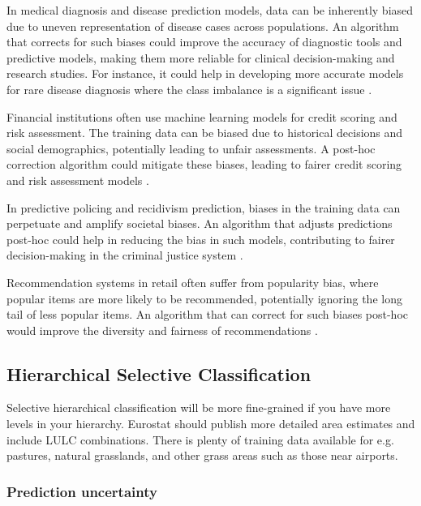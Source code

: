             In medical diagnosis and disease prediction models, data can be inherently biased due to uneven representation of disease cases across populations. An algorithm that corrects for such biases could improve the accuracy of diagnostic tools and predictive models, making them more reliable for clinical decision-making and research studies. For instance, it could help in developing more accurate models for rare disease diagnosis where the class imbalance is a significant issue \citep{weiss2004mining,krawczyk2016learning}.

            Financial institutions often use machine learning models for credit scoring and risk assessment. The training data can be biased due to historical decisions and social demographics, potentially leading to unfair assessments. A post-hoc correction algorithm could mitigate these biases, leading to fairer credit scoring and risk assessment models \citep{chen2018why, kamiran2012data}.

            In predictive policing and recidivism prediction, biases in the training data can perpetuate and amplify societal biases. An algorithm that adjusts predictions post-hoc could help in reducing the bias in such models, contributing to fairer decision-making in the criminal justice system \citep{berk2021fairness, dressel2018accuracy}.

            Recommendation systems in retail often suffer from popularity bias, where popular items are more likely to be recommended, potentially ignoring the long tail of less popular items. An algorithm that can correct for such biases post-hoc would improve the diversity and fairness of recommendations \citep{abdollahpouri2019managing}.
    
    
    \subsection{Hierarchical Selective Classification}
    
        Selective hierarchical classification will be more fine-grained if you have more levels in your hierarchy.
        Eurostat should publish more detailed area estimates and include LULC combinations. There is plenty of training data available for e.g. pastures, natural grasslands, and other grass areas such as those near airports.

        \subsubsection{Prediction uncertainty}
        
